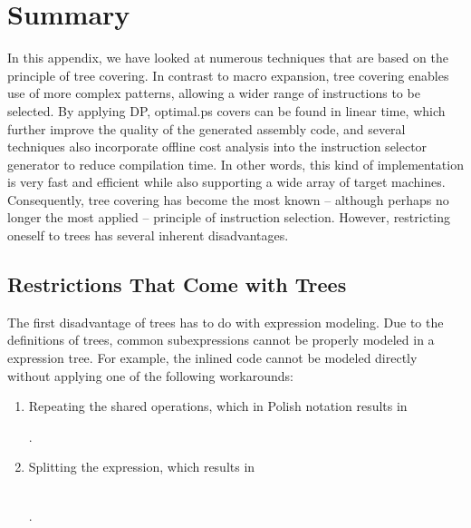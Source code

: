 {\section{Summary}

In this appendix, we have looked at numerous techniques that are based on the
\gls{principle} of \gls{tree covering}.
%
In contrast to \gls{macro expansion},
\gls{tree covering} enables use of more complex \glspl{pattern}, allowing a
wider range of \glspl{instruction} to be selected.
%
By applying \glsdesc{DP},
\gls{optimal.ps} covers can be found in linear time, which further
improve the quality of the generated \gls{assembly code}, and several
techniques also incorporate \gls{offline cost analysis} into the
\gls{instruction selector} generator to reduce compilation time.
%
In other
words, this kind of implementation is very fast and efficient while also
supporting a wide array of \glspl{target machine}.
%
Consequently, \gls{tree
  covering} has become the most known -- although perhaps no longer the most
applied -- \gls{principle} of \gls{instruction selection}.
%
However,
restricting oneself to \glspl{tree} has several inherent disadvantages.


\subsection{Restrictions That Come with Trees}

%
%
%
The first disadvantage of \glspl{tree} has to do with expression modeling.
%
Due
to the definitions of \glspl{tree}, common subexpressions cannot be properly
modeled in a \gls{expression tree}.
%
For example, the inlined code cannot be modeled
directly without applying one of the following workarounds:
\begin{enumerate}
  \item Repeating the shared operations, which in \gls{Polish notation} results
    in
    \begin{center}
      \small%
      .
    \end{center}
  \item Splitting the expression, which results in
    \begin{center}
      \small%
      \\
      .
    \end{center}
\end{enumerate}

}
